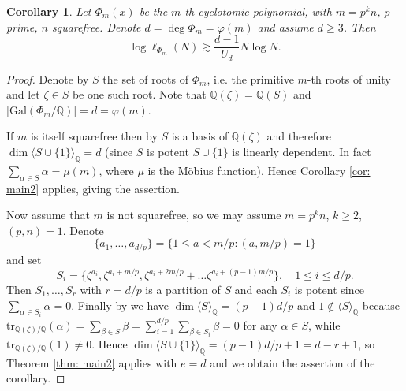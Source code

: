 \documentclass[alphabetic]{amsart}
\newtheorem{cor}[claim]{Corollary}
\theoremstyle{definition}
\numberwithin{equation}{section}
\newcommand{\Q}{{\mathbb Q}}
\newcommand{\Gal}{{\mathrm{Gal}}}
\numberwithin{equation}{section}
\begin{document}
\begin{cor}\label{cor: cyclotomic}
    Let $\Phi_m(x)$ be the $m$-th cyclotomic polynomial, with $m=p^kn$, $p$ prime, $n$ squarefree. Denote $d=\deg\Phi_m=\varphi(m)$ and assume $d\ge 3$. Then
    $$\log\ell_{\Phi_m}(N)\gtrsim\frac {d-1}{U_d}N\log N.$$
\end{cor}

\begin{proof} Denote by $S$ the set of roots of $\Phi_m$, i.e. the primitive $m$-th roots of unity and let $\zeta\in S$ be one such root. Note that $\Q(\zeta)=\Q(S)$ and $|\Gal(\Phi_m/\Q)|=d=\varphi(m)$. 

If $m$ is itself squarefree then by \cite[p. 57]{Joh85} $S$ is a basis of $\Q(\zeta)$ and therefore $\dim\langle S\cup\{1\}\rangle_\Q=d$ (since $S$ is potent $S\cup\{1\}$ is linearly dependent. In fact $\sum_{\alpha\in S}\alpha=\mu(m)$, where $\mu$ is the M\"obius function). Hence Corollary \ref{cor: main2} applies, giving the assertion.

Now assume that $m$ is not squarefree, so we may assume $m=p^kn$, $k\ge 2$, $(p,n)=1$.
Denote 
$$\{a_1,\ldots,a_{d/p}\}=\{1\le a<m/p: (a,m/p)=1\}$$ and set
$$S_i=\{\zeta^{a_i},\zeta^{a_i+m/p},\zeta^{a_i+2m/p}+\ldots\zeta^{a_i+(p-1)m/p}\},\quad 1\le i\le d/p.$$
Then $S_1,\ldots,S_r$ with $r=d/p$ is a partition of $S$ and each $S_i$ is potent since $\sum_{\alpha\in S_i}\alpha=0$. Finally by \cite[p. 57]{Joh85} we have $\dim\langle S\rangle_\Q=(p-1)d/p$ and $1\not\in\langle S\rangle_\Q$ because $\mathrm{tr}_{\Q(\zeta)/\Q}(\alpha)=\sum_{\beta\in S}\beta=\sum_{i=1}^{d/p}\sum_{\beta\in S_i}\beta=0$ for any $\alpha\in S$, while $\mathrm{tr}_{\Q(\zeta)/\Q}(1)\neq 0$. Hence $\dim\langle S\cup\{1\}\rangle_\Q=(p-1)d/p+1=d-r+1$, so Theorem \ref{thm: main2} applies with $e=d$ and we obtain the assertion of the corollary.
\end{proof}
\end{document}
